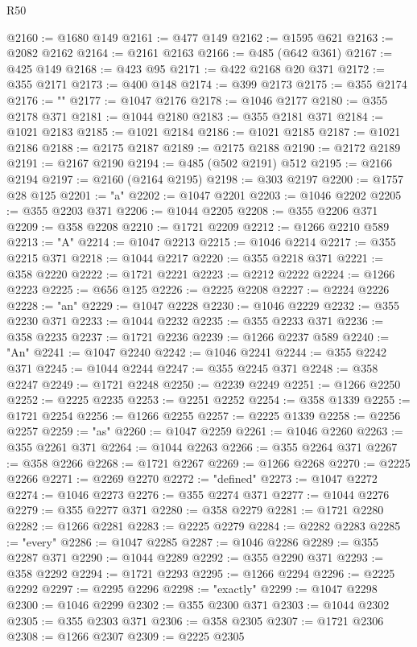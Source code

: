 \begin{lexlean}{R50}
\begin{coremodule}
@2160 := @1680 @149
@2161 := @477 @149
@2162 := @1595 @621
@2163 := @2082 @2162
@2164 := @2161 @2163
@2166 := @485 (@642 @361)
@2167 := @425 @149
@2168 := @423 @95
@2171 := @422 @2168 @20 @371
@2172 := @355 @2171
@2173 := @400 @148
@2174 := @399 @2173
@2175 := @355 @2174
@2176 := ""
@2177 := @1047 @2176
@2178 := @1046 @2177
@2180 := @355 @2178 @371
@2181 := @1044 @2180
@2183 := @355 @2181 @371
@2184 := @1021 @2183
@2185 := @1021 @2184
@2186 := @1021 @2185
@2187 := @1021 @2186
@2188 := @2175 @2187
@2189 := @2175 @2188
@2190 := @2172 @2189
@2191 := @2167 @2190
@2194 := @485 (@502 @2191) @512
@2195 := @2166 @2194
@2197 := @2160 (@2164 @2195)
@2198 := @303 @2197
@2200 := @1757 @28 @125
@2201 := "a"
@2202 := @1047 @2201
@2203 := @1046 @2202
@2205 := @355 @2203 @371
@2206 := @1044 @2205
@2208 := @355 @2206 @371
@2209 := @358 @2208
@2210 := @1721 @2209
@2212 := @1266 @2210 @589
@2213 := "A"
@2214 := @1047 @2213
@2215 := @1046 @2214
@2217 := @355 @2215 @371
@2218 := @1044 @2217
@2220 := @355 @2218 @371
@2221 := @358 @2220
@2222 := @1721 @2221
@2223 := @2212 @2222
@2224 := @1266 @2223
@2225 := @656 @125
@2226 := @2225 @2208
@2227 := @2224 @2226
@2228 := "an"
@2229 := @1047 @2228
@2230 := @1046 @2229
@2232 := @355 @2230 @371
@2233 := @1044 @2232
@2235 := @355 @2233 @371
@2236 := @358 @2235
@2237 := @1721 @2236
@2239 := @1266 @2237 @589
@2240 := "An"
@2241 := @1047 @2240
@2242 := @1046 @2241
@2244 := @355 @2242 @371
@2245 := @1044 @2244
@2247 := @355 @2245 @371
@2248 := @358 @2247
@2249 := @1721 @2248
@2250 := @2239 @2249
@2251 := @1266 @2250
@2252 := @2225 @2235
@2253 := @2251 @2252
@2254 := @358 @1339
@2255 := @1721 @2254
@2256 := @1266 @2255
@2257 := @2225 @1339
@2258 := @2256 @2257
@2259 := "as"
@2260 := @1047 @2259
@2261 := @1046 @2260
@2263 := @355 @2261 @371
@2264 := @1044 @2263
@2266 := @355 @2264 @371
@2267 := @358 @2266
@2268 := @1721 @2267
@2269 := @1266 @2268
@2270 := @2225 @2266
@2271 := @2269 @2270
@2272 := "defined"
@2273 := @1047 @2272
@2274 := @1046 @2273
@2276 := @355 @2274 @371
@2277 := @1044 @2276
@2279 := @355 @2277 @371
@2280 := @358 @2279
@2281 := @1721 @2280
@2282 := @1266 @2281
@2283 := @2225 @2279
@2284 := @2282 @2283
@2285 := "every"
@2286 := @1047 @2285
@2287 := @1046 @2286
@2289 := @355 @2287 @371
@2290 := @1044 @2289
@2292 := @355 @2290 @371
@2293 := @358 @2292
@2294 := @1721 @2293
@2295 := @1266 @2294
@2296 := @2225 @2292
@2297 := @2295 @2296
@2298 := "exactly"
@2299 := @1047 @2298
@2300 := @1046 @2299
@2302 := @355 @2300 @371
@2303 := @1044 @2302
@2305 := @355 @2303 @371
@2306 := @358 @2305
@2307 := @1721 @2306
@2308 := @1266 @2307
@2309 := @2225 @2305

\end{coremodule}
\end{lexlean}
